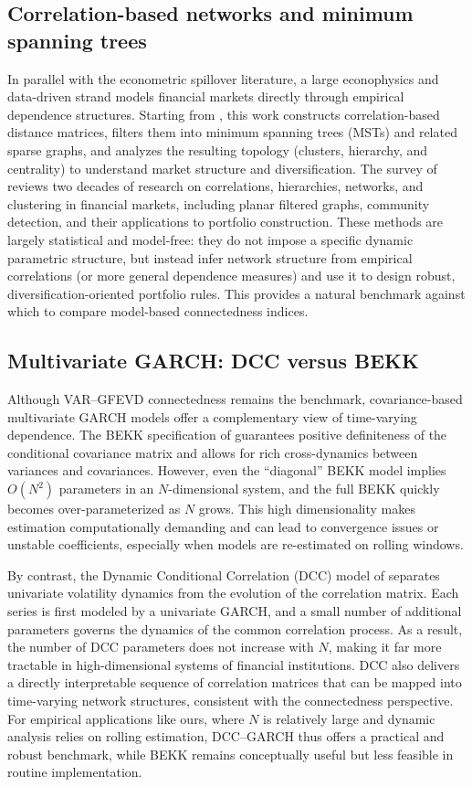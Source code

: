 \subsection{Correlation-based networks and minimum spanning trees}

In parallel with the econometric spillover literature, a large econophysics and
data-driven strand models financial markets directly through empirical dependence
structures. Starting from \citet{Mantegna1999}, this work constructs correlation-based
distance matrices, filters them into minimum spanning trees (MSTs) and related sparse
graphs, and analyzes the resulting topology (clusters, hierarchy, and
centrality) to understand market structure and diversification. The survey of
\citet{MartiEtAl2020} reviews two decades of research on correlations, hierarchies,
networks, and clustering in financial markets, including planar filtered graphs, community
detection, and their applications to portfolio construction. These methods are largely
statistical and model-free: they do not impose a specific dynamic parametric structure,
but instead infer network structure from empirical correlations (or more general
dependence measures) and use it to design robust, diversification-oriented portfolio
rules. This provides a natural benchmark against which to compare model-based
connectedness indices.

\subsection{Multivariate GARCH: DCC versus BEKK}

Although VAR--GFEVD connectedness remains the benchmark, covariance-based multivariate
GARCH models offer a complementary view of time-varying dependence. The BEKK
specification of \citet{EngleKroner1995} guarantees positive definiteness of the
conditional covariance matrix and allows for rich cross-dynamics between variances and
covariances. However, even the ``diagonal'' BEKK model implies $O(N^2)$ parameters in
an $N$-dimensional system, and the full BEKK quickly becomes over-parameterized as $N$
grows. This high dimensionality makes estimation computationally demanding and can lead
to convergence issues or unstable coefficients, especially when models are re-estimated
on rolling windows.

By contrast, the Dynamic Conditional Correlation (DCC) model of \citet{Engle2002DCC}
separates univariate volatility dynamics from the evolution of the correlation matrix.
Each series is first modeled by a univariate GARCH, and a small number of additional
parameters governs the dynamics of the common correlation process. As a result, the
number of DCC parameters does not increase with $N$, making it far more tractable in
high-dimensional systems of financial institutions. DCC also delivers a directly
interpretable sequence of correlation matrices that can be mapped into time-varying
network structures, consistent with the connectedness perspective. For empirical
applications like ours, where $N$ is relatively large and dynamic analysis relies on
rolling estimation, DCC--GARCH thus offers a practical and robust benchmark, while BEKK
remains conceptually useful but less feasible in routine implementation.

